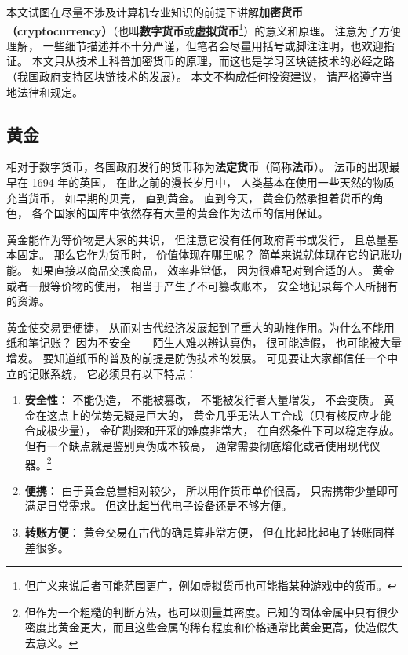 
本文试图在尽量不涉及计算机专业知识的前提下讲解\textbf{加密货币（cryptocurrency）}（也叫\textbf{数字货币}或\textbf{虚拟货币}\footnote{但广义来说后者可能范围更广，例如虚拟货币也可能指某种游戏中的货币。}）的意义和原理。 注意为了方便理解， 一些细节描述并不十分严谨，但笔者会尽量用括号或脚注注明，也欢迎指证。 本文只从技术上科普加密货币的原理，而这也是学习区块链技术的必经之路（我国政府支持区块链技术的发展）。 本文不构成任何投资建议， 请严格遵守当地法律和规定。

\subsection{黄金}
相对于数字货币，各国政府发行的货币称为\textbf{法定货币}（简称\textbf{法币}）。 法币的出现最早在 1694 年的英国， 在此之前的漫长岁月中， 人类基本在使用一些天然的物质充当货币， 如早期的贝壳， 直到黄金。 直到今天， 黄金仍然承担着货币的角色， 各个国家的国库中依然存有大量的黄金作为法币的信用保证。

黄金能作为等价物是大家的共识， 但注意它没有任何政府背书或发行， 且总量基本固定。 那么它作为货币时， 价值体现在哪里呢？ 简单来说就体现在它的记账功能。 如果直接以商品交换商品， 效率非常低， 因为很难配对到合适的人。 黄金或者一般等价物的使用， 相当于产生了不可篡改账本， 安全地记录每个人所拥有的资源。

黄金使交易更便捷， 从而对古代经济发展起到了重大的助推作用。为什么不能用纸和笔记账？ 因为不安全——陌生人难以辨认真伪， 很可能造假， 也可能被大量增发。 要知道纸币的普及的前提是防伪技术的发展。 可见要让大家都信任一个中立的记账系统， 它必须具有以下特点：
\begin{enumerate}
\item \textbf{安全性}： 不能伪造， 不能被篡改， 不能被发行者大量增发， 不会变质。 黄金在这点上的优势无疑是巨大的， 黄金几乎无法人工合成（只有核反应才能合成极少量）， 金矿勘探和开采的难度非常大， 在自然条件下可以稳定存放。 但有一个缺点就是鉴别真伪成本较高， 通常需要彻底熔化或者使用现代仪器。\footnote{但作为一个粗糙的判断方法，也可以测量其密度。已知的固体金属中只有很少密度比黄金更大，而且这些金属的稀有程度和价格通常比黄金更高，使造假失去意义。}
\item \textbf{便携}： 由于黄金总量相对较少， 所以用作货币单价很高， 只需携带少量即可满足日常需求。 但这比起当代电子设备还是不够方便。
\item \textbf{转账方便}： 黄金交易在古代的确是算非常方便， 但在比起比起电子转账同样差很多。
\end{enumerate}

